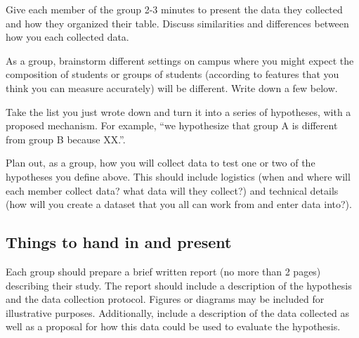 \documentclass{article}\usepackage[]{graphicx}\usepackage[]{color}
\begin{document}
\begin{exercise}
Give each member of the group 2-3 minutes to present the data they collected and how they organized their table. Discuss similarities and differences between how you each collected data.
\end{exercise}

\begin{exercise}
As a group, brainstorm different settings on campus where you might expect the composition of students or groups of students (according to features that you think you can measure accurately) will be different. Write down a few below. 
\end{exercise}

\vspace{7em}

\begin{exercise}
Take the list you just wrote down and turn it into a series of hypotheses, with a proposed mechanism. For example, ``we hypothesize that group A is different from group B because XX.''.
\end{exercise}

\vspace{7em}

\begin{exercise}
Plan out, as a group, how you will collect data to test one or two of the hypotheses you define above. This should include logistics (when and where will each member collect data? what data will they collect?) and technical details (how will you create a dataset that you all can work from and enter data into?).
\end{exercise}


\subsection*{Things to hand in and present}

Each group should prepare a brief written report (no more than 2 pages) describing their study. The report should include a description of the hypothesis and the data collection protocol. Figures or diagrams may be included for illustrative purposes. Additionally, include a description of the data collected as well as a proposal for how this data could be used to evaluate the hypothesis.
\end{document}
